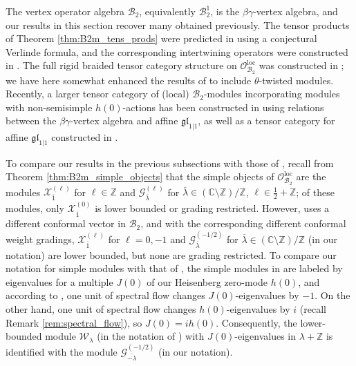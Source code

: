 \documentclass[11pt, reqno]{amsart}
\theoremstyle{definition}\newtheorem{defi}[thm]{Definition}
\theoremstyle{definition}\newtheorem{rem}[thm]{Remark}
\theoremstyle{definition}\newtheorem{exam}[thm]{Example}
\theoremstyle{definition}\newtheorem{assum}[thm]{Assumption}
\newcommand{\cB}{\mathcal{B}}
\newcommand{\cX}{\mathcal{X}}
\newcommand{\cO}{\mathcal{O}}
\newcommand{\cG}{\mathcal{G}}
\newcommand{\cW}{\mathcal{W}}
\newcommand{\CC}{\mathbb{C}}
\newcommand{\ZZ}{\mathbb{Z}}
\newcommand{\Oloc}{\cO^{\mathrm{loc}}}
\begin{document}
The vertex operator algebra $\cB_2$, equivalently $\cB_2^1$, is the $\beta\gamma$-vertex algebra, and our results in this section recover many obtained previously. The tensor products of Theorem \ref{thm:B2m_tens_prods} were predicted in \cite{RW} using a conjectural Verlinde formula, and the corresponding intertwining operators were constructed in \cite{AP}. The full rigid braided tensor category structure on $\Oloc_{\cB_2}$ was constructed in \cite{AW}; we have here somewhat enhanced the results of \cite{AW} to include $\theta$-twisted modules. Recently, a larger tensor category of (local) $\cB_2$-modules incorporating modules with non-semisimple $h(0)$-actions has been constructed in \cite{BN} using relations between the $\beta\gamma$-vertex algebra and affine $\mathfrak{gl}_{1\vert 1}$, as well as a tensor category for affine $\mathfrak{gl}_{1\vert 1}$ constructed in \cite{CMY3}.

To compare our results in the previous subsections with those of \cite{AW}, recall from Theorem \ref{thm:B2m_simple_objects} that the simple objects of $\Oloc_{\cB_2}$ are the modules $\cX_{\overline{1}}^{(\ell)}$ for $\ell\in\ZZ$ and $\cG_{\overline{\lambda}}^{(\ell)}$ for $\overline{\lambda}\in (\CC\setminus\ZZ)/\ZZ$, $\ell\in\frac{1}{2}+\ZZ$; of these modules, only $\cX_{\overline{1}}^{(0)}$ is lower bounded or grading restricted. However, \cite{AW} uses a different conformal vector in $\cB_2$, and with the corresponding different conformal weight gradings, $\cX_{\overline{1}}^{(\ell)}$ for $\ell=0,-1$ and $\cG_{\overline{\lambda}}^{(-1/2)}$ for $\overline{\lambda}\in(\CC\setminus\ZZ)/\ZZ$ (in our notation) are lower bounded, but none are grading restricted. To compare our notation for simple modules with that of \cite{AW}, the simple modules in \cite{AW} are labeled by eigenvalues for a multiple $J(0)$ of our Heisenberg zero-mode $h(0)$, and according to \cite[Equation 2.15]{AW}, one unit of spectral flow changes $J(0)$-eigenvalues by $-1$. On the other hand, one unit of spectral flow changes $h(0)$-eigenvalues by $i$ (recall Remark \ref{rem:spectral_flow}), so $J(0)=i h(0)$. Consequently, the lower-bounded module $\cW_\lambda$ (in the notation of \cite{AW}) with $J(0)$-eigenvalues in $\lambda+\ZZ$ is identified with the module $\cG_{\overline{-\lambda}}^{(-1/2)}$ (in our notation).
\end{document}
